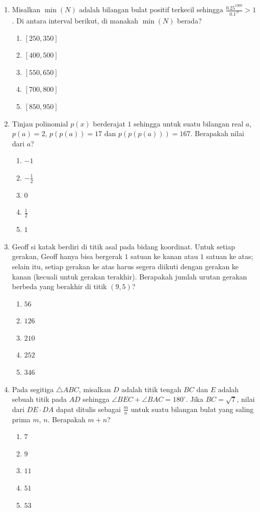 \documentclass{article}
\begin{document}
\begin{enumerate}
\item Misalkan $\min(N)$ adalah bilangan bulat positif terkecil sehingga $\frac{0.25^{1000}}{0.1^{N}}>1$. Di antara interval berikut, di manakah $\min(N)$ berada?
\begin{enumerate}
    \item $[250, 350]$
    \item $[400, 500]$
    \item $[550, 650]$
    \item $[700, 800]$
    \item $[850, 950]$
\end{enumerate}

\item Tinjau polinomial $p(x)$ berderajat $1$ sehingga untuk suatu bilangan real $a$, $p(a)=2$, $p(p(a))=17$ dan $p(p(p(a)))=167$. Berapakah nilai dari $a$?
\begin{enumerate}
    \item $-1$
    \item $-\frac{1}{2}$
    \item $0$
    \item $\frac{1}{2}$
    \item $1$
\end{enumerate}

\item Geoff si katak berdiri di titik asal pada bidang koordinat. Untuk setiap gerakan, Geoff hanya bisa bergerak $1$ satuan ke kanan atau $1$ satuan ke atas; selain itu, setiap gerakan ke atas harus segera diikuti dengan gerakan ke kanan (kecuali untuk gerakan terakhir). Berapakah jumlah urutan gerakan berbeda yang berakhir di titik $(9,5)$?
\begin{enumerate}
    \item $56$
    \item $126$
    \item $210$
    \item $252$
    \item $346$
\end{enumerate}

\item Pada segitiga $\triangle ABC$, misalkan $D$ adalah titik tengah $BC$ dan $E$ adalah sebuah titik pada $AD$ sehingga $\angle BEC+\angle BAC=180^{\circ}$. Jika $BC=\sqrt{7}$, nilai dari $DE \cdot DA$ dapat ditulis sebagai $\frac{m}{n}$ untuk suatu bilangan bulat yang saling prima $m$, $n$. Berapakah $m+n$?
\begin{enumerate}
    \item $7$
    \item $9$
    \item $11$
    \item $51$
    \item $53$
\end{enumerate}


\end{enumerate}
\end{document}

